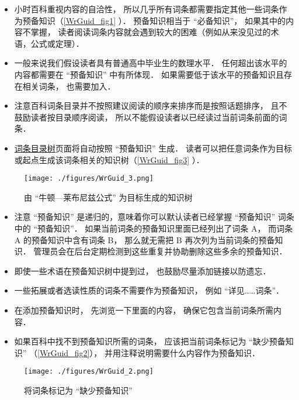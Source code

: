 \begin{itemize}
\item 小时百科重视内容的自洽性， 所以几乎所有词条都需要指定其他一些词条作为预备知识（\autoref{WrGuid_fig1} ）． 预备知识相当于 “必备知识”， 如果其中的内容不掌握， 读者阅读词条内容就会遇到较大的困难（例如从来没见过的术语，公式或定理）．
\item 一般来说我们假设读者具有普通高中毕业生的数理水平． 任何超出该水平的内容都需要在 “预备知识” 中有所体现． 如果需要低于该水平的预备知识且存在相关词条， 也需要加入．
\item 注意百科词条目录并不按照建议阅读的顺序来排序而是按照话题排序， 且不鼓励读者按目录顺序阅读， 所以不能假设读者以已经读过当前词条前面的词条．
\item \href{http://wuli.wiki/tree/}{词条目录树}页面将自动按照 “预备知识” 生成． 读者可以把任意词条作为目标或起点生成该词条相关的知识树（\autoref{WrGuid_fig3} ）．
\end{itemize}

\begin{figure}[ht]
\centering
\texttt{[image: ./figures/WrGuid\_3.png]}
\caption{由 “牛顿—莱布尼兹公式” 为目标生成的知识树} \label{WrGuid_fig3}
\end{figure}

\begin{itemize}
\item 注意 “预备知识” 是递归的，意味着你可以默认读者已经掌握 “预备知识” 词条中的 “预备知识”． 如果当前词条的预备知识里面已经列出了词条 A， 而词条 A 的预备知识中含有词条 B， 那么就无需把 B 再次列为当前词条的预备知识． 管理员会在后台定期检测到这些重复并协助删除这些多余的预备知识．
\item 即使一些术语在预备知识树中提到过， 也鼓励尽量添加链接以防遗忘．
\item 一些拓展或者选读性质的词条不需要作为预备知识， 例如 “详见……词条”．
\item 在添加预备知识时， 先浏览一下里面的内容， 确保它包含当前词条所需内容．
\item 如果百科中找不到预备知识所需的词条， 应该把当前词条标记为 “缺少预备知识” （\autoref{WrGuid_fig2}）， 并用注释说明需要什么内容作为预备知识．
\end{itemize}

\begin{figure}[ht]
\centering
\texttt{[image: ./figures/WrGuid\_2.png]}
\caption{将词条标记为 “缺少预备知识”} \label{WrGuid_fig2}
\end{figure}

